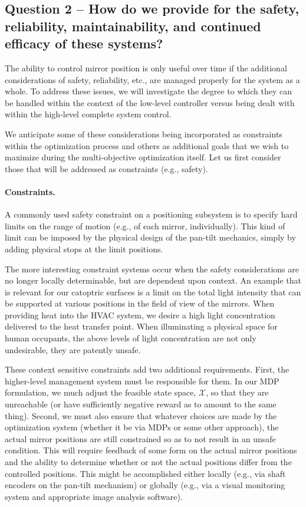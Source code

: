 \subsection{Question 2 -- How do we provide for the safety, reliability,
maintainability, and continued efficacy of these systems?}

The ability to control mirror position is only useful over time if
the additional considerations of safety, reliability, etc., are managed
properly for the system as a whole. To address these issues, we will
investigate the degree to which they can be handled within the context
of the low-level controller versus being dealt with within the high-level
complete system control.

We anticipate some of these considerations being incorporated as constraints
within the optimization process and others as additional goals that we
wish to maximize during the multi-objective optimization itself.  Let us
first consider those that will be addressed as constraints (e.g., safety).

\paragraph{Constraints.}
A commonly used safety constraint on a positioning subsystem is to
specify hard limits on the range of motion (e.g., of each mirror, individually).
This kind of limit can be imposed by the physical design of the pan-tilt
mechanics, simply by adding physical stops at the limit positions.

The more interesting constraint systems occur when the safety considerations
are no longer locally determinable, but are dependent upon context.
An example that is relevant for our catoptric surfaces is a limit on
the total light intensity that can be supported at various positions in the
field of view of the mirrors. When providing heat into the HVAC system,
we desire a high light concentration delivered to the heat transfer point.
When illuminating a physical space for human occupants, the above
levels of light concentration are not only undesirable, they are patently
unsafe.

These context sensitive constraints add two additional requirements.
First, the higher-level management system must be responsible for them.
In our MDP formulation, we much adjust the feasible state space, $\mathcal{X}$,
so that they are unreachable (or have sufficiently negative reward as to
amount to the same thing).
Second, we must also ensure that whatever choices are made by the optimization
system (whether it be via MDPs or some other approach), the actual
mirror positions are still constrained so as to not result in an
unsafe condition.  This will require feedback of some form on the actual
mirror positions and the ability to determine whether or not the actual
positions differ from the controlled positions.  This might be accomplished
either locally (e.g., via shaft encoders on the pan-tilt mechanism) or
globally (e.g., via a visual monitoring system and appropriate image analysis
software).

